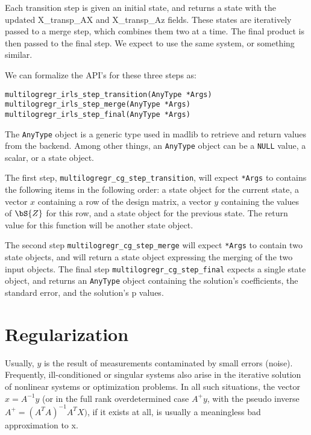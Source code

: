Each transition step is given an initial state, and returns a state with the updated X\_transp\_AX and X\_transp\_Az fields.  These states are iteratively passed to a merge step, which combines them two at a time.  The final product is then passed to the final step.  We expect to use the same system, or something similar.  

We can formalize the API's for these three steps as:
\begin{verbatim}
multilogregr_irls_step_transition(AnyType *Args)
multilogregr_irls_step_merge(AnyType *Args)
multilogregr_irls_step_final(AnyType *Args)
\end{verbatim}
The \texttt{AnyType} object is a generic type used in  madlib to retrieve and return values from the backend.  Among other things, an  \texttt{AnyType} object can be a \texttt{NULL} value, a scalar, or a state object.  

The first step, \texttt{multilogregr\_cg\_step\_transition}, will expect \texttt{*Args} to contains the following items in the following order: a state object for the current state, a vector $x$ containing a row of the design matrix, a vector $y$ containing the values of $\bS{Z}$ for this row, and a state object for the previous state.  The return value for this function will be another state object.  

The second step \texttt{multilogregr\_cg\_step\_merge} will expect \texttt{*Args} to contain two state objects, and will return a state object expressing the merging of the two input objects.  The final step \texttt{multilogregr\_cg\_step\_final} expects a single state object, and returns an \texttt{AnyType} object containing the solution's coefficients, the standard error, and the solution's p values.   









\section{Regularization} %
\label{sub:regularization}

Usually, $y$ is the result of measurements contaminated by small errors
(noise). Frequently, ill-conditioned or singular systems also arise in the iterative solution of nonlinear systems or optimization problems. In all such situations, the vector $x = {A}^{-1}y$ (or in the full rank overdetermined
case $A^+ y$, with the pseudo inverse $A^+ = (A^T A)^{-1}A^T X)$, if it exists at all, is usually a meaningless bad approximation to x.

